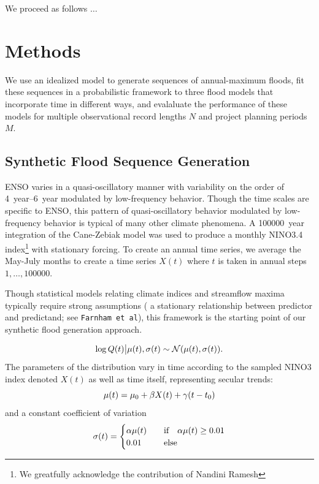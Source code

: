\documentclass[12pt]{article}
\begin{document}
We proceed as follows \(\ldots{}\)

\section{Methods}\label{sec:methods}

We use an idealized model to generate sequences of annual-maximum floods, fit these sequences in a probabilistic framework to three flood models that incorporate time in different ways, and evalaluate the performance of these models for multiple observational record lengths \(N\) and project planning periods \(M\).

\subsection{Synthetic Flood Sequence Generation}

ENSO \citep[see][for a comprehensive review]{Sarachik2010} varies in a quasi-oscillatory manner with variability on the order of \SIrange{4}{6}{year} modulated by low-frequency behavior.
Though the time scales are specific to ENSO, this pattern of quasi-oscillatory behavior modulated by low-frequency behavior is typical of many other climate phenomena.
A \SI{100000}{year} integration of the Cane-Zebiak model \citep{Zebiak1987} was used to produce a monthly NINO3.4 index\footnote{We greatfully acknowledge the contribution of Nandini Ramesh} with stationary forcing.
To create an annual time series, we average the May-July months to create a time series \( X(t) \) where \(t\) is taken in annual steps \(1, \ldots, \num{100000}\).

Though statistical models relating climate indices and streamflow maxima typically require strong assumptions (\ie{} a stationary relationship between predictor and predictand; see \texttt{Farnham et al}), this framework is the starting point of our synthetic flood generation approach.

\begin{equation} \label{eq:lognormal}
  \log Q(t) \big| \mu(t),\sigma(t) \sim \mathcal{N} \qty(\mu(t), \sigma(t)).
\end{equation}
The parameters of the distribution vary in time according to the sampled NINO3 index denoted \( X(t) \) as well as time itself, representing secular trends:
\begin{equation}
  \mu(t) = \mu_0 + \beta X(t) + \gamma \qty(t - t_0)
\end{equation}
and a constant coefficient of variation
\begin{equation}
  \sigma(t) = \begin{cases} \alpha \mu(t) & \qqtext{if} \alpha \mu(t) \geq 0.01 \\ 0.01 & \qqtext{else} \end{cases}
\end{equation}
\end{document}
